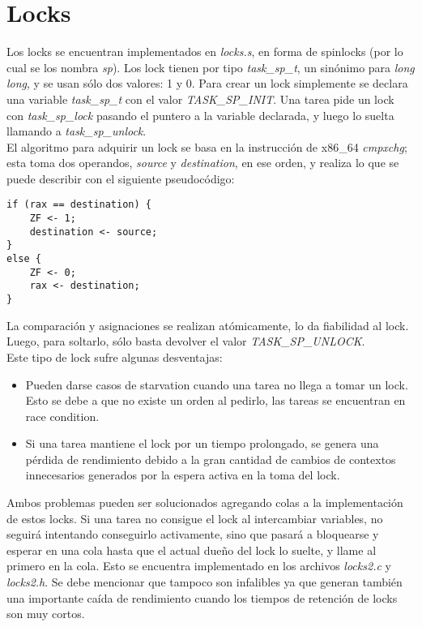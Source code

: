 \documentclass[a4paper]{article}
\begin{document}
\section{Locks}
Los locks se encuentran implementados en \textit{locks.s}, en forma
de spinlocks (por lo cual se los nombra \textit{sp}). Los lock tienen
por tipo \textit{task\_sp\_t}, un sin\'onimo para \textit{long long},
y se usan sólo dos valores: 1 y 0. Para crear un lock simplemente
se declara una variable \textit{task\_sp\_t} con el valor
\textit{TASK\_SP\_INIT}. Una tarea pide un lock con
\textit{task\_sp\_lock} pasando el puntero a la variable declarada, y
luego lo suelta llamando a \textit{task\_sp\_unlock}.\\
El algoritmo para adquirir un lock se basa en la instrucci\'on de x86\_64
\textit{cmpxchg}; esta toma dos operandos, \textit{source} y
\textit{destination}, en ese orden, y realiza lo que se puede describir
con el siguiente pseudoc\'odigo:
\begin{verbatim}
if (rax == destination) {
    ZF <- 1;
    destination <- source;
}
else {
    ZF <- 0;
    rax <- destination;
}
\end{verbatim}
La comparaci\'on y asignaciones se realizan at\'omicamente, lo da
fiabilidad al lock. Luego, para soltarlo, s\'olo basta devolver el
valor \textit{TASK\_SP\_UNLOCK}. \\
Este tipo de lock sufre algunas desventajas:
\begin{itemize}
    \item Pueden darse casos de starvation cuando una tarea no llega
    a tomar un lock. Esto se debe a que no existe un orden al pedirlo,
    las tareas se encuentran en race condition.
    \item Si una tarea mantiene el lock por un tiempo prolongado, se
    genera una p\'erdida de rendimiento debido a la gran cantidad de
    cambios de contextos innecesarios generados por la espera activa
    en la toma del lock.
\end{itemize}
Ambos problemas pueden ser solucionados agregando colas a la
implementaci\'on de estos locks. Si una tarea no consigue el lock al
intercambiar variables, no seguir\'a intentando conseguirlo activamente,
sino que pasar\'a a bloquearse y esperar en una cola hasta que el actual
dueño del lock lo suelte, y llame al primero en la cola. Esto se
encuentra implementado en los archivos \textit{locks2.c} y
\textit{locks2.h}. Se debe mencionar que tampoco son infalibles ya que
generan tambi\'en una importante ca\'ida de rendimiento cuando los
tiempos de retenci\'on de locks son muy cortos.
\end{document}
